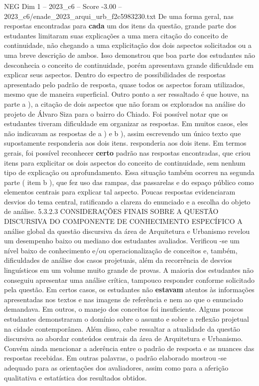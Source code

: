 \begin{textsample}{NEG Dim 1 – 2023\_c6 – Score -3.00 – 2023\_c6/enade\_2023\_arqui\_urb\_f2c5983230.txt}
De uma forma geral, nas respostas encontradas para \textbf{cada} um dos itens da questão, grande parte dos estudantes limitaram suas explicações a uma mera citação do conceito de continuidade, não chegando a uma explicitação dos dois aspectos solicitados ou a uma breve descrição de ambos.
Isso demonstrou que boa parte dos estudantes não desconhecia o conceito de continuidade, porém apresentava grande dificuldade em explicar seus aspectos.
Dentro do espectro de possibilidades de respostas apresentado pelo padrão de resposta, quase todos os aspectos foram utilizados, mesmo que de maneira superficial.
Outro ponto a ser ressaltado é que houve, na parte a ), a citação de dois aspectos que não foram os explorados na análise do projeto de Álvaro Siza para o bairro do Chiado.
Foi possível notar que os estudantes tiveram dificuldade em organizar as respostas.
Em muitos casos, eles não indicavam as respostas de a ) e b ), assim escrevendo um único texto que supostamente responderia aos dois itens. responderia aos dois itens.
Em termos gerais, foi possível reconhecer \textbf{certo} padrão nas respostas encontradas, que criou itens para explicitar os dois aspectos do conceito de continuidade, sem nenhum tipo de explicação ou aprofundamento.
Essa situação também ocorreu na segunda parte ( item b ), que fez uso das rampas, das passarelas e do espaço público como elementos centrais para explicar tal aspecto.
Poucas respostas evidenciaram desvios do tema central, ratificando a clareza do enunciado e a escolha do objeto de análise. 5.3.2.3 CONSIDERAÇÕES FINAIS SOBRE A QUESTÃO DISCURSIVA DO COMPONENTE DE CONHECIMENTO ESPECÍFICO A análise global da questão discursiva da área de Arquitetura e Urbanismo revelou um desempenho baixo ou mediano dos estudantes avaliados.
Verificou -se um nível baixo de conhecimento e/ou operacionalização de conceitos e, também, dificuldades de análise dos casos projetuais, além da recorrência de desvios linguísticos em um volume muito grande de provas.
A maioria dos estudantes não conseguiu apresentar uma análise crítica, tampouco responder conforme solicitado pela questão.
Em certos casos, os estudantes não \textbf{estavam} atentos às informações apresentadas nos textos e nas imagens de referência e nem ao que o enunciado demandava.
Em outros, o manejo dos conceitos foi insuficiente.
Alguns poucos estudantes demonstraram o domínio sobre o assunto e sobre a reflexão projetual na cidade contemporânea.
Além disso, cabe ressaltar a atualidade da questão discursiva ao abordar conteúdos centrais da área de Arquitetura e Urbanismo.
Convém ainda mencionar a aderência entre o padrão de resposta e as nuances das respostas recebidas.
Em outras palavras, o padrão elaborado mostrou -se adequado para as orientações dos avaliadores, assim como para a aferição qualitativa e estatística dos resultados obtidos.

\end{textsample}
